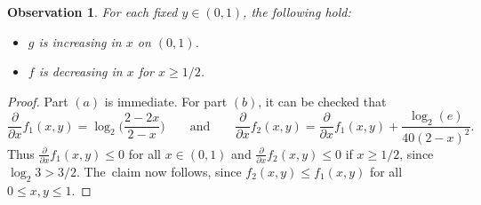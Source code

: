 \documentclass[12pt,reqno]{amsart}
\newtheorem{obs}[theorem]{Observation}
\theoremstyle{definition}
\theoremstyle{remark}
\renewcommand{\le}{\leqslant}
\renewcommand{\ge}{\geqslant}
\begin{document}

\begin{obs}\label{obs:Gff:monotone}
For each fixed $y \in (0,1)$, the following hold:
\begin{itemize}
\item[$(a)$] $g$ is increasing in $x$ on $(0,1)$.\smallskip
\item[$(b)$] $f$ is decreasing in $x$ for $x \ge 1/2$. 
\end{itemize}
\end{obs}

\begin{proof}
Part $(a)$ is immediate. For part $(b)$, %
it can be checked that 
$$\frac{\partial}{\partial x} f_1(x,y) = \log_2 \bigg( \frac{2-2x}{2-x} \bigg) \qquad \text{and} \qquad \frac{\partial}{\partial x} f_2(x,y) = \frac{\partial}{\partial x} f_1(x,y) + \frac{\log_2(e)}{40(2-x)^2}.$$
Thus $\frac{\partial}{\partial x} f_1(x,y) \le 0$ for all $x \in (0,1)$ and $\frac{\partial}{\partial x} f_2(x,y) \le 0$ if $x \ge 1/2$, since $\log_2 3 > 3/2$. The~claim now follows, since $f_2(x,y) \le f_1(x,y)$ for all $0 \le x,y \le 1$. %
\end{proof}
\end{document}

